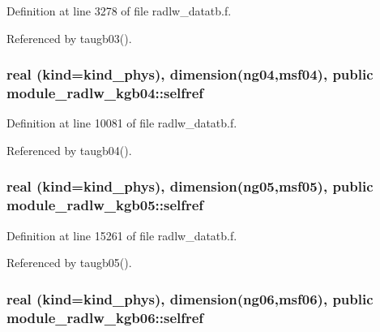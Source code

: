 Definition at line 3278 of file radlw\+\_\+datatb.\+f.



Referenced by taugb03().

\subsubsection[{\texorpdfstring{selfref}{selfref}}]{\setlength{\rightskip}{0pt plus 5cm}real (kind=kind\+\_\+phys), dimension(ng04,msf04), public module\+\_\+radlw\+\_\+kgb04\+::selfref}\hypertarget{group__module__radlw__main_ga696b91ef86ccbda17df10f770797cafa}{}\label{group__module__radlw__main_ga696b91ef86ccbda17df10f770797cafa}


Definition at line 10081 of file radlw\+\_\+datatb.\+f.



Referenced by taugb04().

\subsubsection[{\texorpdfstring{selfref}{selfref}}]{\setlength{\rightskip}{0pt plus 5cm}real (kind=kind\+\_\+phys), dimension(ng05,msf05), public module\+\_\+radlw\+\_\+kgb05\+::selfref}\hypertarget{group__module__radlw__main_ga3c727eabe159c88fca912f33a2b91943}{}\label{group__module__radlw__main_ga3c727eabe159c88fca912f33a2b91943}


Definition at line 15261 of file radlw\+\_\+datatb.\+f.



Referenced by taugb05().

\subsubsection[{\texorpdfstring{selfref}{selfref}}]{\setlength{\rightskip}{0pt plus 5cm}real (kind=kind\+\_\+phys), dimension(ng06,msf06), public module\+\_\+radlw\+\_\+kgb06\+::selfref}\hypertarget{group__module__radlw__main_ga98901725947a4477924a47af5e67277e}{}\label{group__module__radlw__main_ga98901725947a4477924a47af5e67277e}


